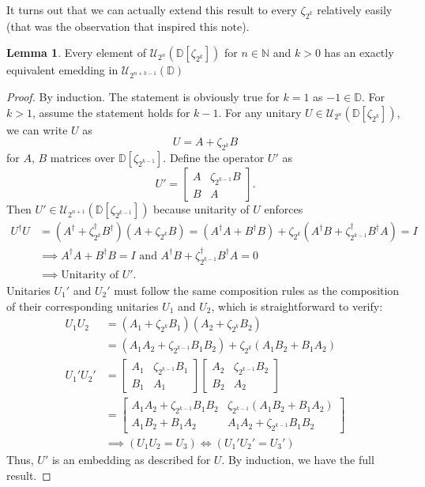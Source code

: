 \documentclass{article}
\theoremstyle{definition}
\theoremstyle{theorem}
\newtheorem{lemma}{Lemma}
\theoremstyle{remark}
\begin{document}
    	It turns out that we can actually extend this result to every $\zeta_{2^k}$ relatively easily (that was the observation that inspired this note).
    	\begin{lemma}
    		Every element of $\mathcal{U}_{2^n}(\mathbb{D}[\zeta_{2^k}])$ for $n\in\mathbb{N}$ and $k>0$ has an exactly equivalent emedding in $\mathcal{U}_{2^{n+k-1}}(\mathbb{D})$
    	\end{lemma}
    	\begin{proof}
    		By induction. The statement is obviously true for $k=1$ as $-1\in\mathbb{D}$. For $k>1$, assume the statement holds for $k-1$. For any unitary $U\in \mathcal{U}_{2^n}(\mathbb{D}[\zeta_{2^{k}}])$, we can write $U$ as
    		\[
    			U = A + \zeta_{2^{k}} B
    		\]
    		for $A$, $B$ matrices over $\mathbb{D}[\zeta_{2^{k-1}}]$. Define the operator $U'$ as
    		\[
    		U' = \begin{bmatrix}
    			A & \zeta_{2^{k-1}} B\\
    			B & A
    			\end{bmatrix}.
    		\]
    		Then $U'\in\mathcal{U}_{2^{n+1}}(\mathbb{D}[\zeta_{2^{k-1}}])$ because unitarity of $U$ enforces
    		\begin{align*}
    		U^\dagger U &= (A^\dagger+\zeta_{2^{k}}^\dagger B^\dagger)(A+\zeta_{2^{k}}B) = (A^\dagger A + B^\dagger B) + \zeta_{2^{k}}(A^\dagger B + \zeta_{2^{k-1}}^\dagger B^\dagger A) = I\\
    		&\implies A^\dagger A + B^\dagger B = I \mbox{ and } A^\dagger B + \zeta_{2^{k-1}}^\dagger B^\dagger A= 0\\
    		&\implies \mbox{Unitarity of } U'.
    		\end{align*}
    		Unitaries $U_1'$ and $U_2'$ must follow the same composition rules as the composition of their corresponding unitaries $U_1$ and $U_2$, which is straightforward to verify:
    		\begin{align*}
    		U_1 U_2 &= (A_1 + \zeta_{2^{k}} B_1)(A_2 + \zeta_{2^{k}} B_2)\\
    		&= (A_1 A_2 + \zeta_{2^{k-1}} B_1 B_2) + \zeta_{2^{k}} (A_1 B_2 + B_1 A_2)\\
    		U_1' U_2' &= \begin{bmatrix}
    		A_1 & \zeta_{2^{k-1}} B_1 \\ B_1 & A_1
    		\end{bmatrix} \begin{bmatrix}
    		A_2 & \zeta_{2^{k-1}} B_2 \\ B_2 & A_2
    		\end{bmatrix}\\
    		&=\begin{bmatrix}
    		A_1 A_2 + \zeta_{2^{k-1}} B_1 B_2& \zeta_{2^{k-1}} (A_1 B_2 + B_1 A_2) \\ A_1 B_2 + B_1 A_2 & A_1 A_2 + \zeta_{2^{k-1}} B_1 B_2
    		\end{bmatrix}\\
    		&\implies (U_1 U_2 = U_3)\iff (U_1' U_2' = U_3')
    		\end{align*}
    		Thus, $U'$ is an embedding as described for $U$. By induction, we have the full result.
    	\end{proof}
\end{document}
